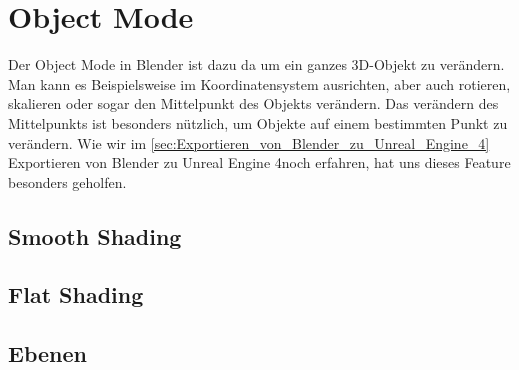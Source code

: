\section{Object Mode}
Der Object Mode in Blender ist dazu da um ein ganzes 3D-Objekt zu verändern. Man kann es Beispielsweise im Koordinatensystem ausrichten, aber
auch rotieren, skalieren oder sogar den Mittelpunkt des Objekts verändern. Das verändern des Mittelpunkts ist besonders nützlich, um Objekte auf
einem bestimmten Punkt zu verändern. Wie wir im \autoref{sec:Exportieren_von_Blender_zu_Unreal_Engine_4} \dq  Exportieren von Blender zu Unreal Engine 4\dq noch erfahren, hat uns dieses Feature besonders geholfen.

\subsection{Smooth Shading}
\subsection{Flat Shading}
\subsection{Ebenen}